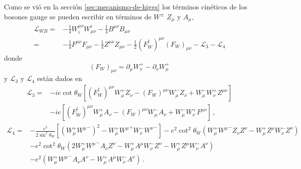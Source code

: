 Como se vi\'o en la secci\'on \ref{sec:mecanismo-de-higgs} los t\'erminos cin\'eticos de los bosones gauge se pueden escribir en t\'erminos de $W^\pm$ $Z_\mu$ y $A_\mu$, 
\begin{align}
  \mathcal{L}_{W B}=&-\tfrac{1}{4}W^{\mu\nu}_i W_{\mu\nu}^i-\tfrac{1}{4}B^{\mu\nu} B_{\mu\nu}\nonumber\\
  =&-\tfrac{1}{4}F^{\mu\nu} F_{\mu\nu}-\tfrac{1}{4}Z^{\mu\nu} Z_{\mu\nu}-\tfrac{1}{2}(F_W^\dagger)^{\mu\nu} (F_W)_{\mu\nu}-\mathcal{L}_3-\mathcal{L}_4
\end{align}
donde
\begin{equation}
  (F_W)_{\mu\nu}=\partial_\mu W^+_\nu-\partial_\nu W^+_\mu
\end{equation}
y $\mathcal{L}_3$ y $\mathcal{L}_4$ est\'an dados en \cite{Pich:2005mk}
\begin{align}
  \mathcal{L}_3=&-ie\cot\theta_W\left[(F_W^\dagger)^{\mu\nu}W_\mu^+ Z_\nu-(F_W)^{\mu\nu}W_\mu^- Z_\nu+W_\mu^-W_\nu^+Z^{\mu\nu}\right]\nonumber\\
&-ie\left[(F_W^\dagger)^{\mu\nu}W_\mu^+ A_\nu-(F_W)^{\mu\nu}W_\mu^- A_\nu+W_\mu^-W_\nu^+F^{\mu\nu}\right]\,,
\end{align}
\begin{align}
\mathcal{L}_4=  &-\frac{e^2}{2\sin^2\theta_W}\left[\left(W_\mu^+{W^\mu}^-\right)^2-W_\mu^+{W^\mu}^+W_\nu^-{W^\nu}^-\right]
-e^2\cot^2\theta_W\left(W_\mu^+{W^\mu}^-Z_\nu Z^\nu-W_\mu^+Z^\mu W_\nu^-Z^\nu\right)\nonumber\\
&-e^2\cot^2\theta_W\left(2W_\mu^+{W^\mu}^-A_\nu Z^\nu-W_\mu^+A^\mu W_\nu^-Z^\nu-W_\mu^+Z^\mu W_\nu^-A^\nu\right)\nonumber\\
&-e^2\left(W_\mu^+{W^\mu}^-A_\nu A^\nu-W_\mu^+A^\mu W_\nu^-A^\nu\right)\,.
\end{align}

